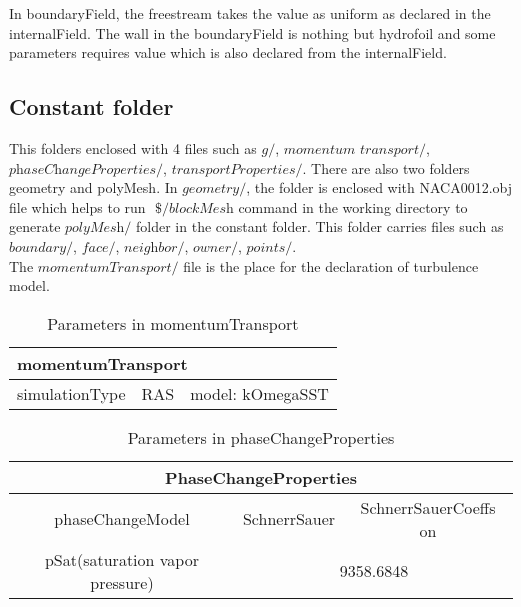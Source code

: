 In boundaryField, the freestream takes the value as uniform as declared in the internalField. The wall in 
the boundaryField is nothing but hydrofoil and some parameters requires value which is also declared from 
the internalField.

\subsection{Constant folder}
This folders enclosed with 4 files such as $\textit{g}/$, $\textit{momentum transport}/$, 
$\textit{phaseChangeProperties}/$, $\textit{transportProperties}/$. There are also two folders geometry 
and polyMesh. In $\textit{geometry}/$, the folder is enclosed with NACA0012.obj file which helps to run 
$\textit{ \$/blockMesh}$ command in the working directory to generate $\textit{polyMesh}/$ folder in the 
constant folder. This folder carries files such as $\textit{boundary}/$, $\textit{face}/$, $\textit{neighbor}/$, 
$\textit{owner}/$, $\textit{points}/$.\\The $\textit{momentumTransport/}$ file is the place for the declaration 
of turbulence model.
\begin{table}[h]
\centering
\begin{tabular}{|lll|}
\hline
\multicolumn{3}{|l|}{momentumTransport}                            \\ \hline
\multicolumn{1}{|l|}{simulationType } & \multicolumn{1}{l|}{RAS} & model:          kOmegaSST \\ \hline
\end{tabular}
\caption{Parameters in momentumTransport}
\label{tab:PC}
\end{table}








\begin{table}[h]
\centering
\begin{tabular}{|ccc|}
\hline
\multicolumn{3}{|c|}{PhaseChangeProperties}                            \\ \hline
\multicolumn{1}{|c|}{phaseChangeModel} & \multicolumn{1}{c|}{SchnerrSauer} & SchnerrSauerCoeffs on \\ \hline
\multicolumn{1}{|c|}{pSat(saturation vapor pressure)} & \multicolumn{2}{c|}{9358.6848}    \\ \hline
\end{tabular}
\caption{Parameters in phaseChangeProperties}
\label{tab:PC}
\end{table}







